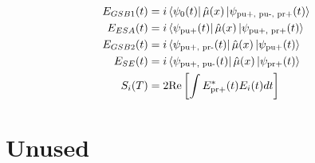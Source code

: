 \begin{align}
	E_{GSB1} (t) &=  i \bra{\psi_{0} (t)} \hat{\mu} (x) \ket{\psi_{\text{pu+, pu-, pr+}} (t)}\\
	E_{ESA} (t) &=  i \bra{\psi_{\text{pu+}} (t)} \hat{\mu} (x) \ket{\psi_{\text{pu+, pr+}} (t)}\\
	E_{GSB2} (t) &=  i \bra{\psi_{\text{pu+, pr-}} (t)} \hat{\mu} (x) \ket{\psi_{\text{pu+}} (t)}\\
	E_{SE} (t) &=  i \bra{\psi_{\text{pu+, pu-}} (t)} \hat{\mu} (x) \ket{\psi_{\text{pr+}} (t)} \\
	S_{i} (T) &= 2 \text{Re} \left[ \int E^*_{\text{pr+}} (t) E_i (t) dt  \right]
\end{align}



\section{Unused}


